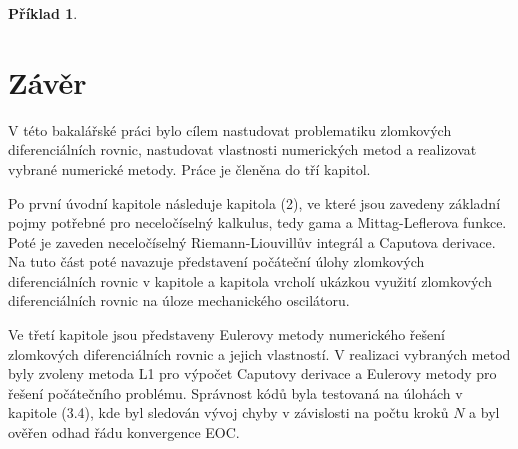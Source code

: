 \documentclass[a4paper,12pt,twoside]{article}
\theoremstyle{definition}
\newtheorem{prikl}[veta]{Příklad}
\theoremstyle{remark}
\numberwithin{equation}{section}
\numberwithin{table}{section}
\numberwithin{figure}{section}
\begin{document}
\begin{prikl}
\begin{table}[h!]
	\end{table}
\end{prikl}

\newpage
\section{Závěr}
V této bakalářské práci bylo cílem nastudovat problematiku zlomkových diferenciálních rovnic, nastudovat vlastnosti numerických metod a realizovat vybrané numerické metody. Práce je členěna do tří kapitol. 

Po první úvodní kapitole následuje kapitola (2), ve které jsou zavedeny základní pojmy potřebné pro neceločíselný kalkulus, tedy gama a Mittag-Leflerova funkce. Poté je zaveden neceločíselný  Riemann-Liouvillův integrál a Caputova derivace.
Na tuto část poté navazuje představení počáteční úlohy zlomkových diferenciálních rovnic v kapitole a kapitola vrcholí ukázkou využití zlomkových diferenciálních rovnic na úloze mechanického oscilátoru. 

Ve třetí kapitole jsou představeny Eulerovy metody numerického řešení zlomkových diferenciálních rovnic a jejich vlastností. V realizaci vybraných metod byly zvoleny metoda L1 pro výpočet Caputovy derivace a Eulerovy metody pro řešení počátečního problému. Správnost kódů byla testovaná na úlohách v kapitole (3.4), kde byl sledován vývoj chyby v závislosti na počtu kroků $N$ a byl ověřen odhad řádu konvergence EOC.
\end{document}
